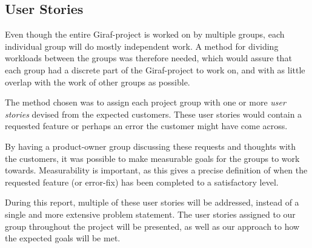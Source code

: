 \subsection{User Stories} \label{ssec:UserStories}
Even though the entire Giraf-project is worked on by multiple groups, each individual group will do mostly independent work.
A method for dividing workloads between the groups was therefore needed, which would assure that each group had a discrete part of the Giraf-project to work on, and with as little overlap with the work of other groups as possible.

The method chosen was to assign each project group with one or more \textit{user stories} devised from the expected customers.
These user stories would contain a requested feature or perhaps an error the customer might have come across.

By having a product-owner group discussing these requests and thoughts with the customers, it was possible to make measurable goals for the groups to work towards.
Measurability is important, as this gives a precise definition of when the requested feature (or error-fix) has been completed to a satisfactory level.

During this report, multiple of these user stories will be addressed, instead of a single and more extensive problem statement.
The user stories assigned to our group throughout the project will be presented, as well as our approach to how the expected goals will be met.
